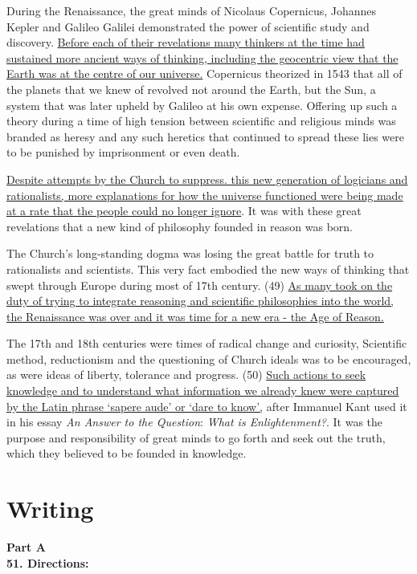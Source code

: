 During the Renaissance, the great minds of Nicolaus Copernicus, Johannes
Kepler and Galileo Galilei demonstrated the power of scientific study
and discovery. \transnum \uline{Before each of their revelations many
thinkers at the time had sustained more ancient ways of thinking,
including the geocentric view that the Earth was at the centre of our
universe.} Copernicus theorized in 1543 that all of the planets that we
knew of revolved not around the Earth, but the Sun, a system that was
later upheld by Galileo at his own expense. Offering up such a theory
during a time of high tension between scientific and religious minds was
branded as heresy and any such heretics that continued to spread these
lies were to be punished by imprisonment or even death.


\transnum \uline{Despite attempts by the Church to suppress. this new
generation of logicians and rationalists, more explanations for how the
universe functioned were being made at a rate that the people could no
longer ignore}. It was with these great revelations that a new kind of
philosophy founded in reason was born.

The Church's long-standing dogma was losing the great battle for truth
to rationalists and scientists. This very fact embodied the new ways of
thinking that swept through Europe during most of 17th century. (49)
\uline{As many took on the duty of trying to integrate reasoning and
scientific philosophies into the world, the Renaissance was over and it
was time for a new era - the Age of Reason.}

The 17th and 18th centuries were times of radical change and curiosity,
Scientific method, reductionism and the questioning of Church ideals was
to be encouraged, as were ideas of liberty, tolerance and progress. (50)
\uline{Such actions to seek knowledge and to understand what
information we already knew were captured by the Latin phrase `sapere
aude' or `dare to know',} after Immanuel Kant used it in his essay
\emph{An Answer to the Question}: \emph{What is Enlightenment?}. It was
the purpose and responsibility of great minds to go forth and seek out
the truth, which they believed to be founded in knowledge.


\newpage
\section{Writing}



\noindent
\textbf{Part A}\\
\textbf{51. Directions:}


